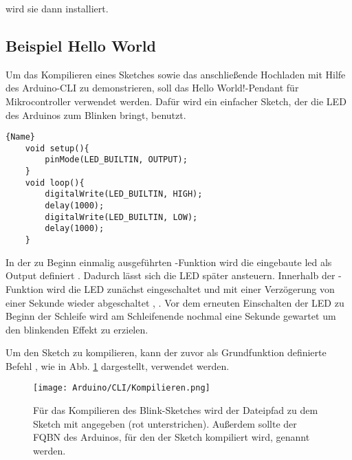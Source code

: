 \medskip


\medskip

wird sie dann installiert.

\subsection{Beispiel \glqq Hello World\grqq}

Um das Kompilieren eines Sketches sowie das anschließende Hochladen mit Hilfe des Arduino-CLI zu demonstrieren, soll das \glqq Hello World!\grqq{}-Pendant für Mikrocontroller verwendet werden. Dafür wird ein einfacher Sketch, der die LED des Arduinos zum Blinken bringt, benutzt.

\begin{lstlisting}{Name}
    void setup(){
        pinMode(LED_BUILTIN, OUTPUT);
    }
    void loop(){
        digitalWrite(LED_BUILTIN, HIGH);
        delay(1000);
        digitalWrite(LED_BUILTIN, LOW);
        delay(1000);
    }
\end{lstlisting}

In der zu Beginn einmalig ausgeführten -Funktion wird die eingebaute \acs{led} als Output definiert . Dadurch lässt sich die LED später ansteuern. Innerhalb der -Funktion wird die LED zunächst eingeschaltet  und mit einer Verzögerung von einer Sekunde  wieder abgeschaltet , . Vor dem erneuten Einschalten der LED zu Beginn der Schleife wird am Schleifenende nochmal eine Sekunde gewartet um den blinkenden Effekt zu erzielen.

Um den Sketch zu kompilieren, kann der zuvor als Grundfunktion definierte Befehl , wie in Abb. \ref{Kompilieren} dargestellt, verwendet werden.

\begin{figure}[h]
    \begin{center}
        \texttt{[image: Arduino/CLI/Kompilieren.png]}
        \caption{Für das Kompilieren des Blink-Sketches wird der Dateipfad zu dem Sketch mit angegeben (rot unterstrichen). Außerdem sollte der FQBN des Arduinos, für den der Sketch kompiliert wird, genannt werden.}
        \label{Kompilieren}
    \end{center}
\end{figure}

